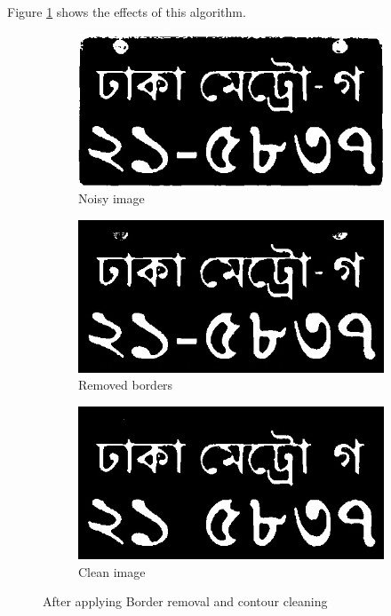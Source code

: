 \documentclass{standalone}
\begin{document}
Figure \ref{fig:CleaningStage} shows the effects of this algorithm.
\begin{figure}
\begin{subfigure}{.5\textwidth}
  \centering
  \includegraphics[width=.8\linewidth]{./img/sample/stage11.jpg}
  \caption{Noisy image}
\end{subfigure}
\begin{subfigure}{.5\textwidth}
  \centering
  \includegraphics[width=.8\linewidth]{./img/sample/stage12.jpg}
  \caption{Removed borders}
\end{subfigure}
\begin{subfigure}{0.9\textwidth}
  \centering
  \includegraphics[width=.8\linewidth]{./img/sample/stage13.jpg}
  \caption{Clean image}
\end{subfigure}
\caption{After applying Border removal and contour cleaning}
\label{fig:CleaningStage}
\end{figure}
\end{document}
